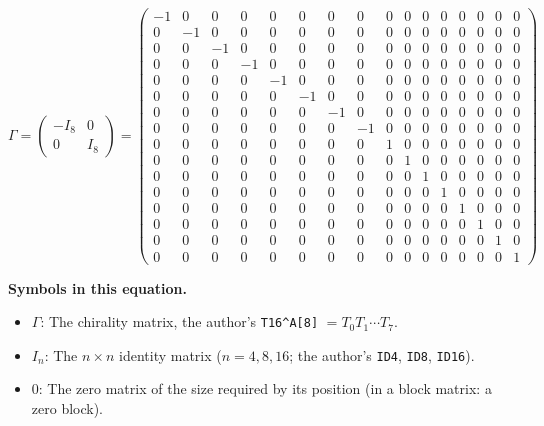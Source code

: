 \documentclass[
  10pt,
]{article}
\providecommand{\tightlist}{%
  \setlength{\itemsep}{0pt}\setlength{\parskip}{0pt}}
\begin{document}
\[
\Gamma = \begin{pmatrix} -I_8 & 0 \\ 0 & I_8 \end{pmatrix} = \scriptstyle \begin{pmatrix} -1 & 0 & 0 & 0 & 0 & 0 & 0 & 0 & 0 & 0 & 0 & 0 & 0 & 0 & 0 & 0 \\ 0 & -1 & 0 & 0 & 0 & 0 & 0 & 0 & 0 & 0 & 0 & 0 & 0 & 0 & 0 & 0 \\ 0 & 0 & -1 & 0 & 0 & 0 & 0 & 0 & 0 & 0 & 0 & 0 & 0 & 0 & 0 & 0 \\ 0 & 0 & 0 & -1 & 0 & 0 & 0 & 0 & 0 & 0 & 0 & 0 & 0 & 0 & 0 & 0 \\ 0 & 0 & 0 & 0 & -1 & 0 & 0 & 0 & 0 & 0 & 0 & 0 & 0 & 0 & 0 & 0 \\ 0 & 0 & 0 & 0 & 0 & -1 & 0 & 0 & 0 & 0 & 0 & 0 & 0 & 0 & 0 & 0 \\ 0 & 0 & 0 & 0 & 0 & 0 & -1 & 0 & 0 & 0 & 0 & 0 & 0 & 0 & 0 & 0 \\ 0 & 0 & 0 & 0 & 0 & 0 & 0 & -1 & 0 & 0 & 0 & 0 & 0 & 0 & 0 & 0 \\ 0 & 0 & 0 & 0 & 0 & 0 & 0 & 0 & 1 & 0 & 0 & 0 & 0 & 0 & 0 & 0 \\ 0 & 0 & 0 & 0 & 0 & 0 & 0 & 0 & 0 & 1 & 0 & 0 & 0 & 0 & 0 & 0 \\ 0 & 0 & 0 & 0 & 0 & 0 & 0 & 0 & 0 & 0 & 1 & 0 & 0 & 0 & 0 & 0 \\ 0 & 0 & 0 & 0 & 0 & 0 & 0 & 0 & 0 & 0 & 0 & 1 & 0 & 0 & 0 & 0 \\ 0 & 0 & 0 & 0 & 0 & 0 & 0 & 0 & 0 & 0 & 0 & 0 & 1 & 0 & 0 & 0 \\ 0 & 0 & 0 & 0 & 0 & 0 & 0 & 0 & 0 & 0 & 0 & 0 & 0 & 1 & 0 & 0 \\ 0 & 0 & 0 & 0 & 0 & 0 & 0 & 0 & 0 & 0 & 0 & 0 & 0 & 0 & 1 & 0 \\ 0 & 0 & 0 & 0 & 0 & 0 & 0 & 0 & 0 & 0 & 0 & 0 & 0 & 0 & 0 & 1 \end{pmatrix}
\]

\textbf{Symbols in this equation.}

\begin{itemize}
\tightlist
\item
  \(\Gamma\): The chirality matrix, the author's
  \texttt{T16\^{}A{[}8{]}} \(= T_0 T_1 \cdots T_7\).
\item
  \(I_n\): The \(n \times n\) identity matrix (\(n = 4, 8, 16\); the
  author's \texttt{ID4}, \texttt{ID8}, \texttt{ID16}).
\item
  \(0\): The zero matrix of the size required by its position (in a
  block matrix: a zero block).
\end{itemize}
\end{document}
